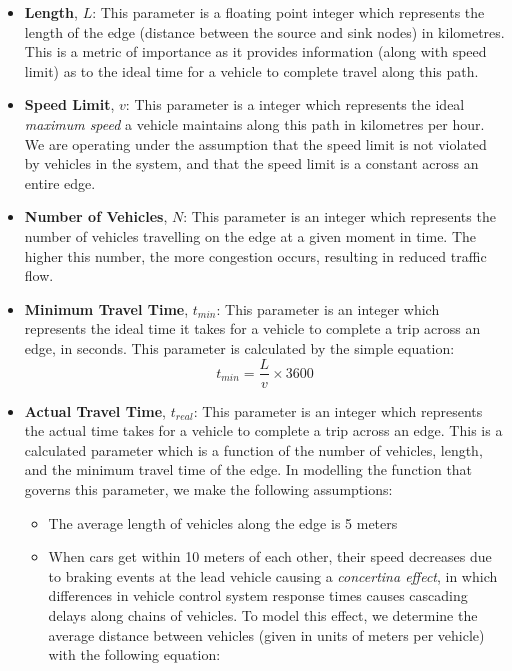 \documentclass[conference]{IEEEtran}
\begin{document}
\begin{itemize}
    \item \textbf{Length}, $L$: This parameter is a floating point integer which represents the length of the edge (distance between the source and sink nodes) in kilometres. This is a metric of importance as it provides information (along with speed limit) as to the ideal time for a vehicle to complete travel along this path.
    \item \textbf{Speed Limit}, $v$: This parameter is a integer which represents the ideal \textit{maximum speed} a vehicle maintains along this path in kilometres per hour. We are operating under the assumption that the speed limit is not violated by vehicles in the system, and that the speed limit is a constant across an entire edge.
    \item \textbf{Number of Vehicles}, $N$: This parameter is an integer which represents the number of vehicles travelling on the edge at a given moment in time. The higher this number, the more congestion occurs, resulting in reduced traffic flow.
    \item \textbf{Minimum Travel Time}, $t_{min}$: This parameter is an integer which represents the ideal time it takes for a vehicle to complete a trip across an edge, in seconds. This parameter is calculated by the simple equation: 
    \begin{equation}
        t_{min} = \frac{L}{v} \times 3600
    \end{equation}
    \item \textbf{Actual Travel Time}, $t_{real}$: This parameter is an integer which represents the actual time takes for a vehicle to complete a trip across an edge. This is a calculated parameter which is a function of the number of vehicles, length, and the minimum travel time of the edge. In modelling the function that governs this parameter, we make the following assumptions:
    \begin{itemize}
        \item The average length of vehicles along the edge is 5 meters \cite{carsize}
        \item When cars get within 10 meters of each other, their speed decreases due to braking events at the lead vehicle causing a \textit{concertina effect}, in which differences in vehicle control system response times causes cascading delays along chains of vehicles. To model this effect, we determine the average distance between vehicles (given in units of meters per vehicle) with the following equation:
        \begin{equation}

\end{equation}
\end{itemize}
\end{itemize}
\end{document}
